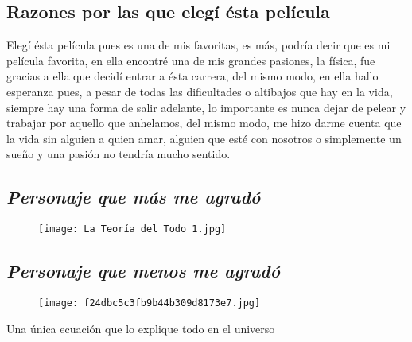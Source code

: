 \documentclass[a5paper, 11pt]{article}
\begin{document}
\small {

    \subsection{Razones por las que elegí ésta película}
    
    Elegí ésta película pues es una de mis favoritas, es más, podría decir que es mi película favorita, en ella encontré una de mis grandes pasiones, la física, fue gracias a ella que decidí entrar a ésta carrera, del mismo modo, en ella hallo esperanza pues, a pesar de todas las dificultades o altibajos que hay en la vida, siempre hay una forma de salir adelante, lo importante es nunca dejar de pelear y trabajar por aquello que anhelamos, del mismo modo, me hizo darme cuenta que la vida sin alguien a quien amar, alguien que esté con nosotros o simplemente un sueño y una pasión no tendría mucho sentido.
    
    \subsection{\emph{\normalsize{Personaje que más me agradó}}}
    
        \begin{figure}[H]
            \raggedleft
            \texttt{[image: La Teoría del Todo 1.jpg]} 
            \caption{}
            
        \end{figure}
    
    \subsection{\emph{\normalsize{Personaje que menos me agradó}}}
    
        \begin{figure}[H]
            \raggedleft
            \texttt{[image: f24dbc5c3fb9b44b309d8173e7.jpg]}\caption{}
            
            
        \end{figure}

\hspace{-2.4cm} {Una única ecuación}
\newline
\hspace{-2.4cm} {que lo explique}
\newline
\hspace{-2.4cm} {todo en el universo}

}
\end{document}
